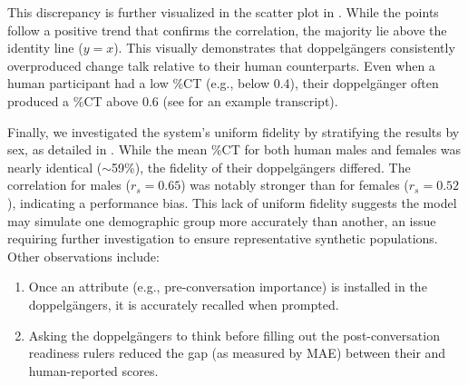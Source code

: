 This discrepancy is further visualized in the scatter plot in . While the points follow a positive trend that confirms the correlation, the majority lie above the identity line ($y=x$). This visually demonstrates that doppelgängers consistently overproduced change talk relative to their human counterparts. Even when a human participant had a low \%CT (e.g., below 0.4), their doppelgänger often produced a \%CT above 0.6 (see  for an example transcript).

Finally, we investigated the system's uniform fidelity by stratifying the results by sex, as detailed in . While the mean \%CT for both human males and females was nearly identical ($\sim$59\%), the fidelity of their doppelgängers differed. The correlation for males ($r_s = 0.65$) was notably stronger than for females ($r_s = 0.52$), indicating a performance bias. This lack of uniform fidelity suggests the model may simulate one demographic group more accurately than another, an issue requiring further investigation to ensure representative synthetic populations. Other observations include:

\begin{enumerate}
	\item Once an attribute (e.g., pre-conversation importance) is installed in the doppelgängers, it is accurately recalled when prompted.
	\item Asking the doppelgängers to think before filling out the post-conversation readiness rulers reduced the gap (as measured by MAE) between their and human-reported scores.
\end{enumerate}



